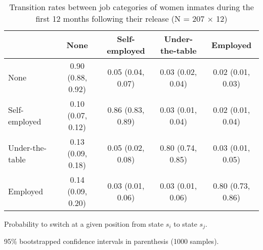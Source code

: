 \begin{table}[htp]
\scriptsize
\setlength{\tabcolsep}{10pt}
\renewcommand{\arraystretch}{1.3}
\begin{threeparttable}
\centering
\caption{Transition rates between job categories of women inmates \newline
    during the first 12 months following their release (N = 207 $\times$ 12)} 
\label{tab:transition_rates_job}
\begin{tabular}{lcccc}
  \hline
 & None & Self-employed & Under-the-table & Employed \\ 
  \hline
None & 0.90 (0.88, 0.92) & 0.05 (0.04, 0.07) & 0.03 (0.02, 0.04) & 0.02 (0.01, 0.03) \\ 
  Self-employed & 0.10 (0.07, 0.12) & 0.86 (0.83, 0.89) & 0.03 (0.01, 0.04) & 0.02 (0.01, 0.04) \\ 
  Under-the-table & 0.13 (0.09, 0.18) & 0.05 (0.02, 0.08) & 0.80 (0.74, 0.85) & 0.03 (0.01, 0.05) \\ 
  Employed & 0.14 (0.09, 0.20) & 0.03 (0.01, 0.06) & 0.03 (0.01, 0.06) & 0.80 (0.73, 0.86) \\ 
   \hline
\end{tabular}
\begin{tablenotes}
\scriptsize
\item Probability to switch at a given position from state $s_i$ to state $s_j$. 
    \item 95\% bootstrapped confidence intervals in parenthesis (1000 samples).
\end{tablenotes}
\end{threeparttable}
\end{table}
